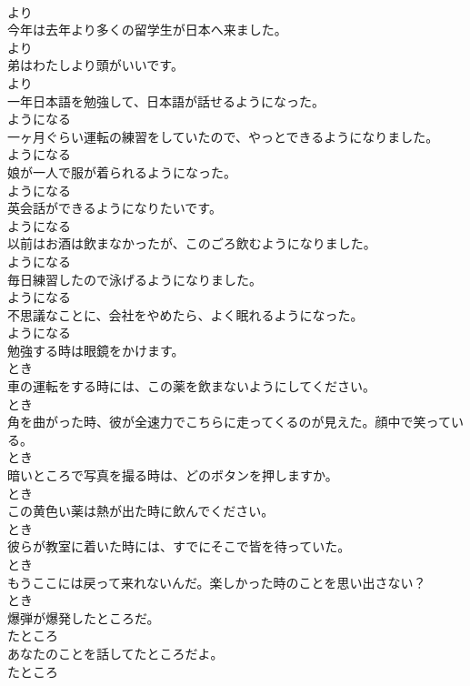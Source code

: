 \documentclass[8pt]{extreport}
\begin{document}
\begin{CJK}{UTF8}{min}
\\	より
\\	今年は去年より多くの留学生が日本へ来ました。	
\\	より
\\	弟はわたしより頭がいいです。	
\\	より
\\	一年日本語を勉強して、日本語が話せるようになった。	
\\	ようになる
\\	一ヶ月ぐらい運転の練習をしていたので、やっとできるようになりました。	
\\	ようになる
\\	娘が一人で服が着られるようになった。	
\\	ようになる
\\	英会話ができるようになりたいです。	
\\	ようになる
\\	以前はお酒は飲まなかったが、このごろ飲むようになりました。	
\\	ようになる
\\	毎日練習したので泳げるようになりました。	
\\	ようになる
\\	不思議なことに、会社をやめたら、よく眠れるようになった。	
\\	ようになる
\\	勉強する時は眼鏡をかけます。	
\\	とき
\\	車の運転をする時には、この薬を飲まないようにしてください。	
\\	とき
\\	角を曲がった時、彼が全速力でこちらに走ってくるのが見えた。顔中で笑っている。	
\\	とき
\\	暗いところで写真を撮る時は、どのボタンを押しますか。	
\\	とき
\\	この黄色い薬は熱が出た時に飲んでください。	
\\	とき
\\	彼らが教室に着いた時には、すでにそこで皆を待っていた。	
\\	とき
\\	もうここには戻って来れないんだ。楽しかった時のことを思い出さない？	
\\	とき
\\	爆弾が爆発したところだ。	
\\	たところ
\\	あなたのことを話してたところだよ。	
\\	たところ

\end{CJK}
\end{document}

